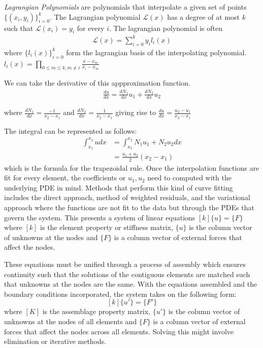 \documentclass[12pt]{article}
\begin{document}
\textit{Lagrangian Polynomials} are polynomials that interpolate a given set of points $\{(x_i, y_i)\}_{i = 0}^k$. The Lagrangian polynomial $\mathcal{L}(x)$ has a degree of at most $k$ such that $\mathcal{L}(x_i) = y_i$ for every $i$. The lagrangian polynomial is often
\begin{align*}
    \mathcal{L}(x) = \sum_{i = 0}^k y_i l_i(x)
\end{align*}
where $\{l_i(x)\}_{i = 0}^k$ form the lagrangian basis of the interpolating polynomial. $l_i(x) = \prod_{0 \leq m \leq k, m \neq i} \frac{x - x_m}{x_i - x_m}$

We can take the derivative of this appproximation function.
\begin{align*}
    \frac{d u}{d x} = \frac{dN_1}{dx} u_1 + \frac{dN_2}{dx}u_2
\end{align*}

where $\frac{dN_1}{dx} = \frac{-1}{x_2 - x_1}$ and $\frac{dN_2}{dx} = \frac{1}{x_2 - x_1}$ giving rise to $\frac{d u}{d x} = \frac{u_2 - u_1}{x_2 - x_1}$

The integral can be represented as follows:
\begin{align*}
    \int_{x_1}^{x_2} u dx &= \int_{x_1}^{x_2} N_1 u_1 + N_2 u_2 dx \\
    &= \frac{u_1 + u_2}{2}(x_2 - x_1)
\end{align*}
which is the formula for the trapezoidal rule. Once the interpolation functions are fit for every element, the coefficients or $u_1, u_2$ need to computed with the underlying PDE in mind. Methods that perform this kind of curve fitting includes the direct approach, method of weighted residuals, and the variational approach where the functions are not fit to the data but through the PDEs that govern the system. This presents a system of linear equations $[k]\{u\} = \{F\}$ where $[k]$ is the element property or stiffness matrix, $\{u\}$ is the column vector of unknowns at the nodes and $\{F\}$ is a column vector of external forces that affect the nodes. 

These equations must be unified through a process of assembly which ensures continuity such that the solutions of the contiguous elements are matched such that unknowns at the nodes are the same. With the equations assembled and the boundary conditions incorporated, the system takes on the following form:
$$[k]\{u'\} = \{F'\}$$ where $[K]$ is the assemblage property matrix, $\{u'\}$ is the column vector of unknowns at the nodes of all elements and $\{F\}$ is a column vector of external forces that affect the nodes across all elements. Solving this might involve elimination or iterative methods. 
\end{document}
